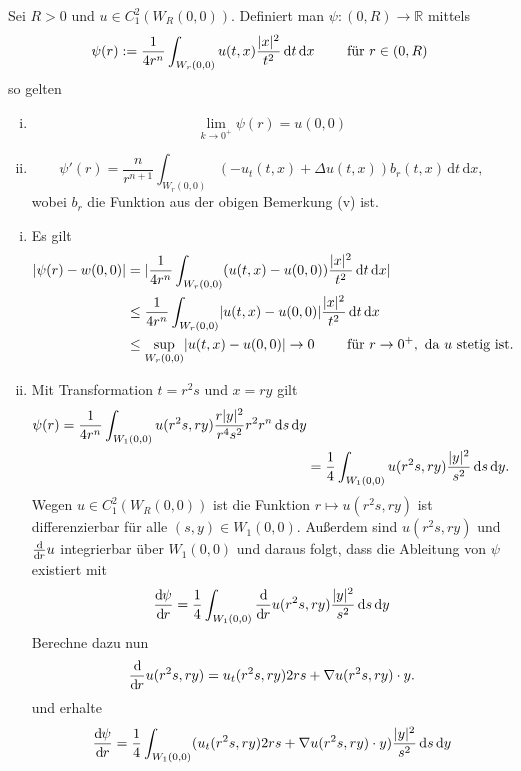 \begin{lemma}
	Sei $R >0$ und $u \in C^2_1(W_R(0,0))$. Definiert man $\psi : (0,R) \to \mathbb{R}$ mittels
	\[
		\psi(r) := \frac{1}{4 r^n} \int_{W_r(0,0)}^{} u(t,x) \frac{\lvert x\rvert^2}{t^2} \,\mathrm{d}t \,\mathrm{d}x \qquad \text{ für } r \in (0,R)
	\]
	so gelten
	\begin{enumerate}[(i)]
		\item \[
			\lim_{k \to 0^+} \psi(r) = u(0,0)
		\]
		\item \[
			\psi'(r) = \frac{n}{r^{n+1}} \int_{W_r(0,0)}^{} (-u_t(t,x)+ \Delta u(t,x))b_r(t,x) \,\mathrm{d}t \,\mathrm{d}x,
		\] wobei $b_r$ die Funktion aus der obigen Bemerkung (v) ist.
	\end{enumerate}
\end{lemma}
\begin{beweis}
	\begin{enumerate}[(i)]
		\item Es gilt
		\begin{align*}
			\lvert \psi(r) - w(0,0)\rvert &= \lvert \frac{1}{4r^n} \int_{W_r(0,0)}^{} (u(t,x)- u(0,0)) \frac{\lvert x\rvert^2}{t^2} \,\mathrm{d}t \, \mathrm{d}x\rvert \\
			& \leq \frac{1}{4 r^n} \int_{W_r(0,0)}^{} \lvert u(t,x)-u(0,0)\rvert \frac{\lvert x\rvert^2}{t^2} \,\mathrm{d}t \, \mathrm{d}x \\
			& \leq \sup_{W_r(0,0)} \lvert u(t,x)-u(0,0)\rvert \to 0 \qquad \text{ für } r \to 0^+, \text{ da } u \text{ stetig ist.}
		\end{align*}
		\item Mit Transformation $t= r^2 s$ und $x = ry$ gilt
		\begin{align*}
			\psi(r) = \frac{1}{4 r^n} \int_{W_1(0,0)}^{}u(r^2s,ry) \frac{r \lvert y\rvert^2}{r^4 s^2} r^2 r^n \,\mathrm{d}s \,\mathrm{d}y \\
			&= \frac{1}{4} \int_{W_1(0,0)}^{} u(r^2s,ry) \frac{\lvert y\rvert^2}{s^2} \,\mathrm{d}s \,\mathrm{d}y.
		\end{align*}
		Wegen $u \in C^2_1(W_R(0,0))$ ist die Funktion $r \mapsto  u(r^2s,ry)$ ist differenzierbar für alle $(s,y) \in W_1(0,0)$. Außerdem sind
		$u(r^2s,ry)$ und $\frac{\mathrm{d}\mkern-1.0mu }{\mathrm{d}\mkern-1.0mu r} u$ integrierbar über $W_1(0,0)$ und daraus folgt, dass die Ableitung von $\psi$ existiert mit
		\[
			\frac{\mathrm{d}\mkern-1.0mu \psi}{\mathrm{d}\mkern-1.0mu r}  = \frac{1}{4} \int_{W_1(0,0)}^{} \frac{\mathrm{d}\mkern-1.0mu }{\mathrm{d}\mkern-1.0mu r}  u(r^2s,ry) \frac{\lvert y\rvert^2}{s^2} \,\mathrm{d}s \,\mathrm{d}y
		\]
		Berechne dazu nun
		\begin{align*}
			\frac{\mathrm{d}\mkern-1.0mu }{\mathrm{d}\mkern-1.0mu r} u(r^2s,ry) = u_t(r^2s,ry)2rs+  \nabla u(r^2s,ry)\cdot y.
		\end{align*}
		und erhalte
		\begin{align*}
			\frac{\mathrm{d}\mkern-1.0mu \psi}{\mathrm{d}\mkern-1.0mu r}  = \frac{1}{4} \int_{W_1(0,0)}^{} ( u_t(r^2s,ry)2rs +  \nabla u(r^2s,ry) \cdot y) \frac{\lvert y\rvert^2}{s^2} \,\mathrm{d}s \,\mathrm{d}y
		\end{align*}
	\end{enumerate}
\end{beweis}